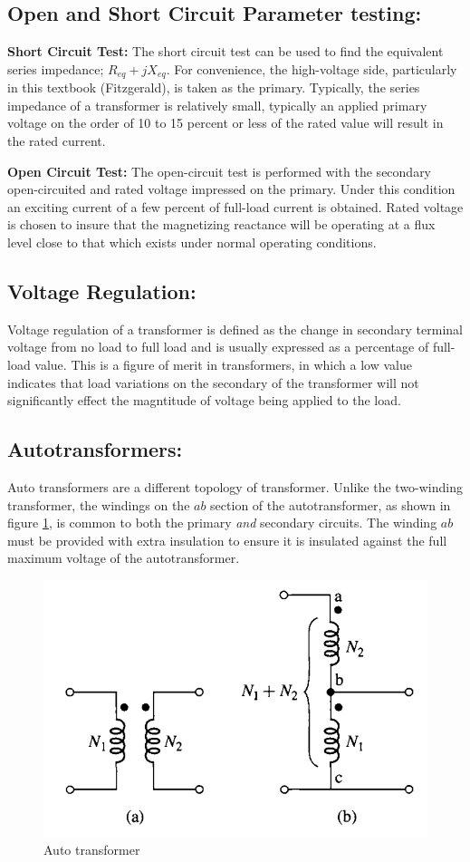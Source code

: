 \documentclass{book}
\begin{document}
\subsection{Open and Short Circuit Parameter testing:}

\textbf{Short Circuit Test:} The short circuit test can be used to find the equivalent series impedance; $R_{eq} + j X_{eq}$. For convenience, the high-voltage side, particularly in this textbook (Fitzgerald), is taken as the primary. Typically, the series impedance of a transformer is relatively small, typically an applied primary voltage on the order of 10 to 15 percent or less of the rated value will result in the rated current.

\textbf{Open Circuit Test:} The open-circuit test is performed with the secondary open-circuited and rated voltage impressed on the primary. Under this condition an exciting current of a few percent of full-load current is obtained. Rated voltage is chosen to insure that the magnetizing reactance will be operating at a flux level close to that which exists under normal operating conditions.

\subsection{Voltage Regulation:}

Voltage regulation of a transformer is defined as the change in secondary terminal voltage from no load to full load and is usually expressed as a percentage of full-load value. This is a figure of merit in transformers, in which a low value indicates that load variations on the secondary of the transformer will not significantly effect the magntitude of voltage being applied to the load.

\subsection{Autotransformers:}

Auto transformers are a different topology of transformer. Unlike the two-winding transformer, the windings on the $ab$ section of the autotransformer, as shown in figure \ref{fig:autotransformers}, is common to both the primary \textit{and} secondary circuits. The winding $ab$ must be provided with extra insulation to ensure it is insulated against the full maximum voltage of the autotransformer. 
\begin{figure}[h]
	\centering
	\includegraphics[width=0.3\linewidth]{Screenshots/auto_transformers}
	\caption{Auto transformer}
	\label{fig:autotransformers}
\end{figure}
\end{document}
